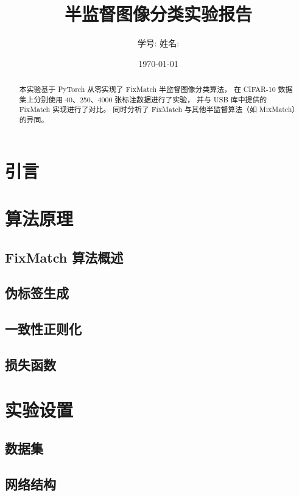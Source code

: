 \documentclass[12pt,a4paper]{article}
\title{\textbf{半监督图像分类实验报告}}
\author{学号: \qquad 姓名:}
\date{\today}
\begin{document}
\maketitle

\begin{abstract}
本实验基于 PyTorch 从零实现了 FixMatch 半监督图像分类算法，
在 CIFAR-10 数据集上分别使用 40、250、4000 张标注数据进行了实验，
并与 USB 库中提供的 FixMatch 实现进行了对比。
同时分析了 FixMatch 与其他半监督算法（如 MixMatch）的异同。
\end{abstract}

\section{引言}

\section{算法原理}
\subsection{FixMatch 算法概述}

\subsection{伪标签生成}

\subsection{一致性正则化}

\subsection{损失函数}

\section{实验设置}
\subsection{数据集}

\subsection{网络结构}
\end{document}
